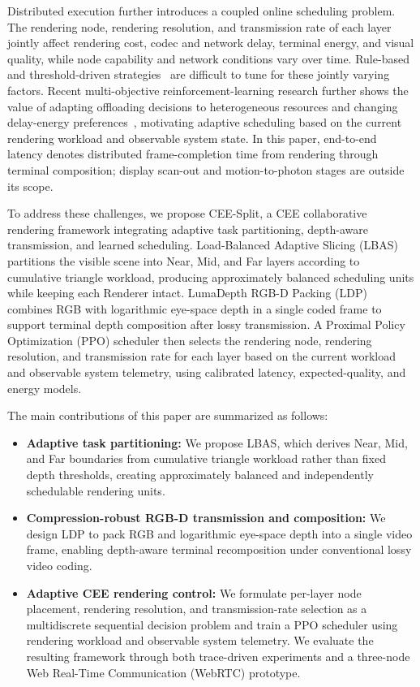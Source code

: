 \documentclass[10pt,journal,compsoc]{IEEEtran}
\begin{document}
Distributed execution further introduces a coupled online scheduling problem. The rendering node, rendering resolution, and transmission rate of each layer jointly affect rendering cost, codec and network delay, terminal energy, and visual quality, while node capability and network conditions vary over time. Rule-based and threshold-driven strategies~\cite{lai_furion_2020,lu_renderfusion_2023} are difficult to tune for these jointly varying factors. Recent multi-objective reinforcement-learning research further shows the value of adapting offloading decisions to heterogeneous resources and changing delay-energy preferences~\cite{yang_generalizable_2025}, motivating adaptive scheduling based on the current rendering workload and observable system state. In this paper, end-to-end latency denotes distributed frame-completion time from rendering through terminal composition; display scan-out and motion-to-photon stages are outside its scope.

To address these challenges, we propose CEE-Split, a CEE collaborative rendering framework integrating adaptive task partitioning, depth-aware transmission, and learned scheduling. Load-Balanced Adaptive Slicing (LBAS) partitions the visible scene into Near, Mid, and Far layers according to cumulative triangle workload, producing approximately balanced scheduling units while keeping each Renderer intact. LumaDepth RGB-D Packing (LDP) combines RGB with logarithmic eye-space depth in a single coded frame to support terminal depth composition after lossy transmission. A Proximal Policy Optimization (PPO) scheduler then selects the rendering node, rendering resolution, and transmission rate for each layer based on the current workload and observable system telemetry, using calibrated latency, expected-quality, and energy models.

The main contributions of this paper are summarized as follows:
\begin{itemize}
	\item \textbf{Adaptive task partitioning:}
	We propose LBAS, which derives Near, Mid, and Far boundaries from cumulative triangle workload rather than fixed depth thresholds, creating approximately balanced and independently schedulable rendering units.
	
	\item \textbf{Compression-robust RGB-D transmission and composition:}
	We design LDP to pack RGB and logarithmic eye-space depth into a single video frame, enabling depth-aware terminal recomposition under conventional lossy video coding.
	
	\item \textbf{Adaptive CEE rendering control:}
	We formulate per-layer node placement, rendering resolution, and transmission-rate selection as a multidiscrete sequential decision problem and train a PPO scheduler using rendering workload and observable system telemetry. We evaluate the resulting framework through both trace-driven experiments and a three-node Web Real-Time Communication (WebRTC) prototype.
\end{itemize}
\end{document}
